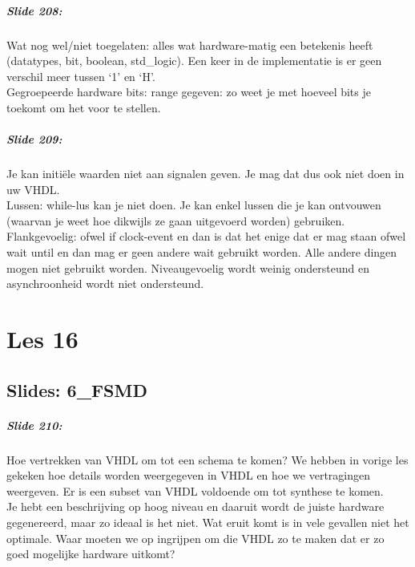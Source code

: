 \documentclass[10pt,a4paper]{book}
\begin{document}
\paragraph{Slide 208:} Wat nog wel/niet toegelaten: alles wat hardware-matig een betekenis heeft (datatypes, bit, boolean, std\_logic). Een keer in de implementatie is er geen verschil meer tussen `1' en `H'.\\
Gegroepeerde hardware bits: range gegeven: zo weet je met hoeveel bits je toekomt om het voor te stellen. 

\paragraph{Slide 209:} Je kan initi\"ele waarden niet aan signalen geven. Je mag dat dus ook niet doen in uw VHDL.\\
Lussen: while-lus kan je niet doen. Je kan enkel lussen die je kan ontvouwen (waarvan je weet hoe dikwijls ze gaan uitgevoerd worden) gebruiken. Flankgevoelig: ofwel if clock-event en dan is dat het enige dat er mag staan ofwel wait until en dan mag er geen andere wait gebruikt worden. Alle andere dingen mogen niet gebruikt worden. Niveaugevoelig wordt weinig ondersteund en asynchroonheid wordt niet ondersteund.

\chapter{Les 16}

\section{Slides: 6\_FSMD}

\paragraph{Slide 210:} Hoe vertrekken van VHDL om tot een schema te komen? We hebben in vorige les gekeken hoe details worden weergegeven in VHDL en hoe we vertragingen weergeven. Er is een subset van VHDL voldoende om tot synthese te komen.\\
Je hebt een beschrijving op hoog niveau en daaruit wordt de juiste hardware gegenereerd, maar zo ideaal is het niet. Wat eruit komt is in vele gevallen niet het optimale. Waar moeten we op ingrijpen om die VHDL zo te maken dat er zo goed mogelijke hardware uitkomt?
\end{document}
